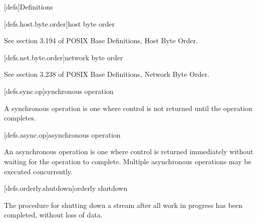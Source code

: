 
[defs]{Definitions}


[defs.host.byte.order]{host byte order}

 See section 3.194 of POSIX Base Definitions, Host Byte Order.

[defs.net.byte.order]{network byte order}

 See section 3.238 of POSIX Base Definitions, Network Byte Order.

[defs.sync.op]{synchronous operation}

 A synchronous operation is one where control is not returned until the operation completes.

[defs.async.op]{asynchronous operation}

 An asynchronous operation is one where control is returned immediately without waiting for the operation to complete. Multiple asynchronous operations may be executed concurrently.

[defs.orderly.shutdown]{orderly shutdown}

 The procedure for shutting down a stream after all work in progress has been completed, without loss of data.

